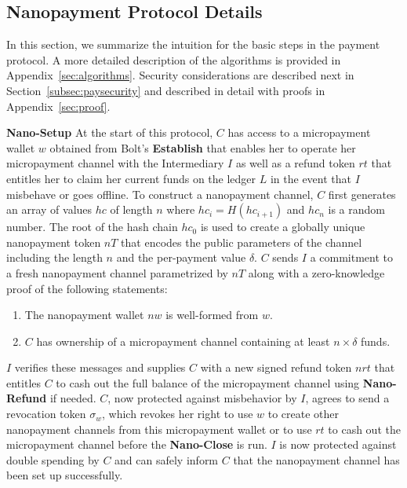 \subsection{Nanopayment Protocol Details}

\label{sec:nanopaymentdetails} In this section, we summarize the intuition for the basic steps in the payment protocol.
A more detailed description of the algorithms is provided in Appendix~\ref{sec:algorithms}.
Security considerations are described next in Section~\ref{subsec:paysecurity} and described in detail with proofs in Appendix~\ref{sec:proof}.

\medskip \noindent\textbf{Nano-Setup} At the start of this protocol, $C$ has access to a micropayment wallet $w$ obtained from Bolt's \textbf{Establish} that enables her to operate her micropayment channel with the Intermediary $I$ as well as a refund token $rt$ that entitles her to claim her current funds on the ledger $L$ in the event that $I$ misbehave or goes offline.
To construct a nanopayment channel, $C$ first generates an array of values $hc$ of length $n$ where $hc_i = H(hc_{i+1})$ and $hc_n$ is a random number.
The root of the hash chain $hc_0$ is used to create a globally unique nanopayment token $nT$ that encodes the public parameters of the channel including the length $n$ and the per-payment value $\delta$.
$C$ sends $I$ a commitment to a fresh nanopayment channel parametrized by $nT$ along with a zero-knowledge proof of the following statements:

\begin{enumerate}
\item The nanopayment wallet $nw$ is well-formed from $w$.
\item $C$ has ownership of a micropayment channel containing at least $n \times \delta$ funds.
\end{enumerate}

$I$ verifies these messages and supplies $C$ with a new signed refund token $nrt$ that entitles $C$ to cash out the full balance of the micropayment channel using \textbf{Nano-Refund} if needed.
$C$, now protected against misbehavior by $I$, agrees to send a revocation token $\sigma_w$, which revokes her right to use $w$ to create other nanopayment channels from this micropayment wallet or to use $rt$ to cash out the micropayment channel before the \textbf{Nano-Close} is run.
$I$ is now protected against double spending by $C$ and can safely inform $C$ that the nanopayment channel has been set up successfully.

